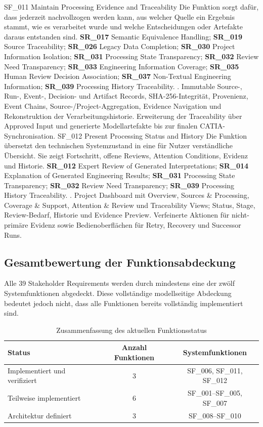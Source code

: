 \featureprofile
{SF\_011}
{Maintain Processing Evidence and Traceability}
{Die Funktion sorgt dafür, dass jederzeit nachvollzogen werden kann, aus
welcher Quelle ein Ergebnis stammt, wie es verarbeitet wurde und welche
Entscheidungen oder Artefakte daraus entstanden sind.}
{\textbf{SR\_017} Semantic Equivalence Handling;
\textbf{SR\_019} Source Traceability;
\textbf{SR\_026} Legacy Data Completion;
\textbf{SR\_030} Project Information Isolation;
\textbf{SR\_031} Processing State Transparency;
\textbf{SR\_032} Review Need Transparency;
\textbf{SR\_033} Engineering Information Coverage;
\textbf{SR\_035} Human Review Decision Association;
\textbf{SR\_037} Non-Textual Engineering Information;
\textbf{SR\_039} Processing History Traceability.}
{.}
{Immutable Source-, Run-, Event-, Decision- und Artifact Records,
SHA-256-Integrität, Provenienz, Event Chains, Source-/Project-Aggregation,
Evidence Navigation und Rekonstruktion der Verarbeitungshistorie.}
{Erweiterung der Traceability über Approved Input und generierte
Modellartefakte bis zur finalen CATIA-Synchronisation.}
\pagebreak
\featureprofile
{SF\_012}
{Present Processing Status and History}
{Die Funktion übersetzt den technischen Systemzustand in eine für Nutzer
verständliche Übersicht. Sie zeigt Fortschritt, offene Reviews,
Attention Conditions, Evidenz und Historie.}
{\textbf{SR\_012} Expert Review of Generated Interpretations;
\textbf{SR\_014} Explanation of Generated Engineering Results;
\textbf{SR\_031} Processing State Transparency;
\textbf{SR\_032} Review Need Transparency;
\textbf{SR\_039} Processing History Traceability.}
{.}
{Project Dashboard mit Overview, Sources \& Processing, Coverage \& Support,
Attention \& Review und Traceability Views; Status, Stage, Review-Bedarf,
Historie und Evidence Preview.}
{Verfeinerte Aktionen für nicht-primäre Evidenz sowie Bedienoberflächen für
Retry, Recovery und Successor Runs.}

\subsection{Gesamtbewertung der Funktionsabdeckung}

Alle 39 Stakeholder Requirements werden durch mindestens eine der zwölf
Systemfunktionen abgedeckt. Diese vollständige modellseitige Abdeckung bedeutet
jedoch nicht, dass alle Funktionen bereits vollständig implementiert sind.

\begin{table}[htbp]
\centering
\caption{Zusammenfassung des aktuellen Funktionsstatus}
\label{tab:function_status_summary}
\begin{tabular}{lcc}
\toprule
\textbf{Status} & \textbf{Anzahl Funktionen} & \textbf{Systemfunktionen} \\
\midrule
Implementiert und verifiziert & 3 & SF\_006, SF\_011, SF\_012 \\
Teilweise implementiert & 6 & SF\_001--SF\_005, SF\_007 \\
Architektur definiert & 3 & SF\_008--SF\_010 \\
\bottomrule
\end{tabular}
\end{table}

